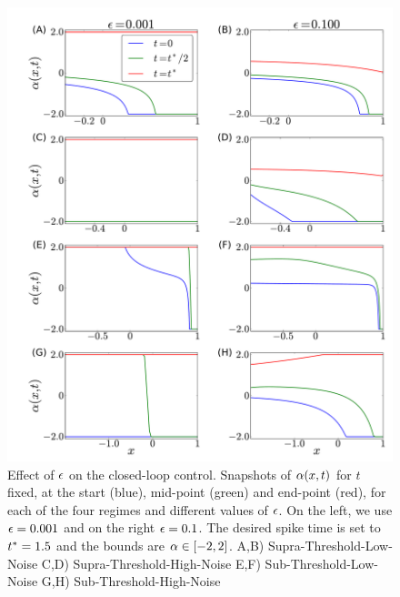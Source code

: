 \documentclass[12pt]{iopart}
\begin{document}
\begin{figure}[htp]
\begin{center}
  \includegraphics[width=\textwidth]{Figs/HJB/Regimes_eps_comparison.pdf}
  \caption[labelInTOC]{Effect of ${\epsilon}$ on the closed-loop control. Snapshots of
  ${\alpha}(x,t)$ for $t$ fixed, at the start (blue), mid-point (green) and end-point
  (red), for each of the four regimes and different values of ${\epsilon}$.
  On the left, we use ${\epsilon} = 0.001$ and on the right ${\epsilon} = 0.1$.
  The desired spike time is set to
  ${ t^* }=1.5$ and the bounds are ${\alpha} \in [-2,2]$. 
  A,B)
   Supra-Threshold-Low-Noise 
  C,D) 
   Supra-Threshold-High-Noise 
  E,F)
   Sub-Threshold-Low-Noise 
  G,H)
   Sub-Threshold-High-Noise}
\label{fig:HJB_4regimes_control_different_eps} 
\end{center}
\end{figure}
\end{document}
